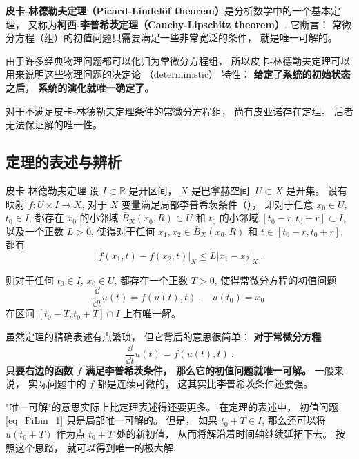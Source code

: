 
\textbf{皮卡-林德勒夫定理（Picard-Lindelöf theorem）}是分析数学中的一个基本定理， 又称为\textbf{柯西-李普希茨定理（Cauchy-Lipschitz theorem）}. 它断言： 常微分方程（组）的初值问题只需要满足一些非常宽泛的条件， 就是唯一可解的。 

由于许多经典物理问题都可以化归为常微分方程组， 所以皮卡-林德勒夫定理可以用来说明这些物理问题的决定论 （deterministic） 特性： \textbf{给定了系统的初始状态之后， 系统的演化就唯一确定了。}

对于不满足皮卡-林德勒夫定理条件的常微分方程组， 尚有皮亚诺存在定理。 后者无法保证解的唯一性。

\subsection{定理的表述与辨析}
\begin{theorem}{皮卡-林德勒夫定理}
设 $I\subset\mathbb{R}$ 是开区间， $X$ 是巴拿赫空间, $U\subset X$ 是开集。 设有映射 $f:U\times I\to X$, 对于 $X$ 变量满足局部李普希茨条件（）， 即对于任意 $x_0\in U$, $t_0\in I$, 都存在 $x_0$ 的小邻域 $\bar B_X(x_0,R)\subset U$ 和 $t_0$ 的小邻域 $[t_0-r,t_0+r]\subset I$, 以及一个正数 $L>0$, 使得对于任何 $x_1,x_2\in \bar B_X(x_0,R)$ 和 $t\in[t_0-r,t_0+r]$, 都有
$$
|f(x_1,t)-f(x_2,t)|_X\leq L|x_1-x_2|_X~.
$$

则对于任何 $t_0\in I$, $x_0\in U$, 都存在一个正数 $T>0$, 使得常微分方程的初值问题
$$
\frac{\dd}{\dd t}u(t)=f(u(t),t)~,\quad u(t_0)=x_0~
$$
在区间 $[t_0-T,t_0+T]\cap I$ 上有唯一解。
\end{theorem}

虽然定理的精确表述有点繁琐， 但它背后的意思很简单： \textbf{对于常微分方程}
\begin{equation}\label{eq_PiLin_1}
\frac{\dd}{\dd t}u(t)=f(u(t),t)~.
\end{equation}
\textbf{只要右边的函数 $f$ 满足李普希茨条件， 那么它的初值问题就唯一可解。} 一般来说， 实际问题中的 $f$ 都是连续可微的， 这其实比李普希茨条件还要强。

"唯一可解"的意思实际上比定理表述得还要更多。 在定理的表述中， 初值问题 \autoref{eq_PiLin_1} 只是局部唯一可解的。 但是， 如果 $t_0+T\in I$, 那么还可以将 $u(t_0+T)$ 作为点 $t_0+T$ 处的新初值， 从而将解沿着时间轴继续延拓下去。 按照这个思路， 就可以得到唯一的极大解.

